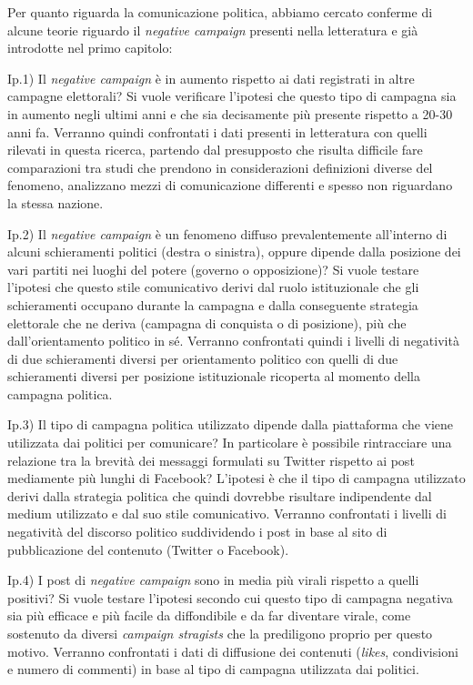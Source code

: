 Per quanto riguarda la comunicazione politica, abbiamo cercato  conferme di alcune teorie riguardo il \textit{negative campaign} presenti nella letteratura e già introdotte nel primo capitolo:

Ip.1) Il \textit{negative campaign} è in aumento rispetto ai dati registrati in altre campagne elettorali? Si vuole verificare l'ipotesi che questo tipo di campagna sia in aumento negli ultimi anni e che sia decisamente più presente rispetto a 20-30 anni fa. Verranno quindi confrontati i dati presenti in letteratura con quelli rilevati in questa ricerca, partendo dal presupposto che risulta difficile fare comparazioni tra studi che prendono in considerazioni definizioni diverse del fenomeno, analizzano mezzi di comunicazione differenti e spesso non riguardano la stessa nazione.

Ip.2) Il \textit{negative campaign} è un fenomeno diffuso prevalentemente all'interno di alcuni schieramenti politici (destra o sinistra), oppure dipende dalla posizione dei vari partiti nei luoghi del potere (governo o opposizione)? Si vuole testare l'ipotesi che questo stile comunicativo derivi dal ruolo istituzionale che gli schieramenti occupano durante la campagna e dalla conseguente strategia elettorale che ne deriva (campagna di conquista o di posizione), più che dall'orientamento politico in sé. Verranno confrontati quindi i livelli di negatività di due schieramenti diversi per orientamento politico con quelli di due schieramenti diversi per posizione istituzionale ricoperta al momento della campagna politica.

Ip.3) Il tipo di campagna politica utilizzato dipende dalla piattaforma che viene utilizzata dai politici per comunicare? In particolare è possibile rintracciare una relazione tra la brevità dei messaggi formulati su Twitter rispetto ai post mediamente più lunghi di Facebook? L'ipotesi è che il tipo di campagna utilizzato derivi dalla strategia politica che quindi dovrebbe risultare indipendente dal medium utilizzato e dal suo stile comunicativo. Verranno confrontati i livelli di negatività del discorso politico  suddividendo i post in base al sito di pubblicazione del contenuto (Twitter o Facebook).

Ip.4) I post di \textit{negative campaign} sono in media più virali rispetto a quelli positivi? Si vuole testare l'ipotesi secondo cui questo tipo di campagna negativa sia più efficace e più facile da diffondibile e da far diventare virale, come sostenuto da diversi \textit{campaign stragists} che la prediligono proprio per questo motivo. Verranno confrontati i dati di diffusione dei contenuti (\textit{likes}, condivisioni e numero di commenti) in base al tipo di campagna utilizzata dai politici. \vspace{8pt}\

